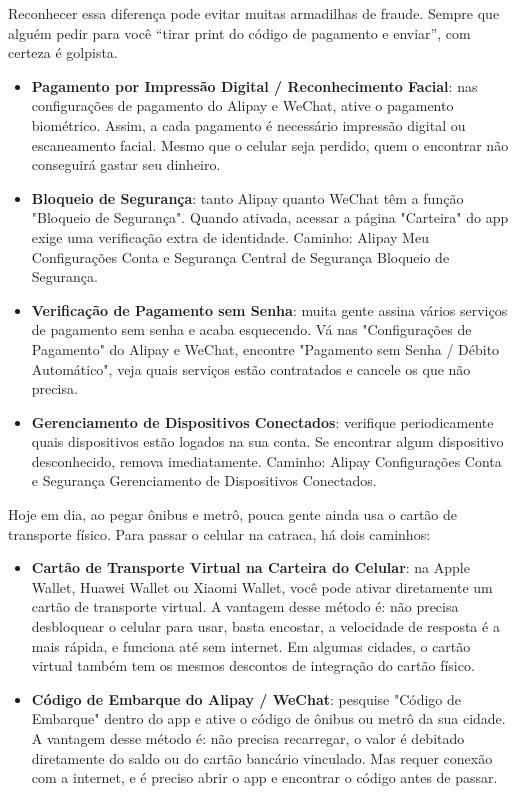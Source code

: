 Reconhecer essa diferença pode evitar muitas armadilhas de fraude. Sempre que alguém pedir para você “tirar print do código de pagamento e enviar”, com certeza é golpista.


\begin{itemize}
  \item \textbf{Pagamento por Impressão Digital / Reconhecimento Facial}: nas configurações de pagamento do Alipay e WeChat, ative o pagamento biométrico. Assim, a cada pagamento é necessário impressão digital ou escaneamento facial. Mesmo que o celular seja perdido, quem o encontrar não conseguirá gastar seu dinheiro.
  \item \textbf{Bloqueio de Segurança}: tanto Alipay quanto WeChat têm a função "Bloqueio de Segurança". Quando ativada, acessar a página "Carteira" do app exige uma verificação extra de identidade. Caminho: Alipay Meu Configurações Conta e Segurança Central de Segurança Bloqueio de Segurança.
  \item \textbf{Verificação de Pagamento sem Senha}: muita gente assina vários serviços de pagamento sem senha e acaba esquecendo. Vá nas "Configurações de Pagamento" do Alipay e WeChat, encontre "Pagamento sem Senha / Débito Automático", veja quais serviços estão contratados e cancele os que não precisa.
  \item \textbf{Gerenciamento de Dispositivos Conectados}: verifique periodicamente quais dispositivos estão logados na sua conta. Se encontrar algum dispositivo desconhecido, remova imediatamente. Caminho: Alipay Configurações Conta e Segurança Gerenciamento de Dispositivos Conectados.
\end{itemize}


Hoje em dia, ao pegar ônibus e metrô, pouca gente ainda usa o cartão de transporte físico. Para passar o celular na catraca, há dois caminhos:

\begin{itemize}
  \item \textbf{Cartão de Transporte Virtual na Carteira do Celular}: na Apple Wallet, Huawei Wallet ou Xiaomi Wallet, você pode ativar diretamente um cartão de transporte virtual. A vantagem desse método é: não precisa desbloquear o celular para usar, basta encostar, a velocidade de resposta é a mais rápida, e funciona até sem internet. Em algumas cidades, o cartão virtual também tem os mesmos descontos de integração do cartão físico.
  \item \textbf{Código de Embarque do Alipay / WeChat}: pesquise "Código de Embarque" dentro do app e ative o código de ônibus ou metrô da sua cidade. A vantagem desse método é: não precisa recarregar, o valor é debitado diretamente do saldo ou do cartão bancário vinculado. Mas requer conexão com a internet, e é preciso abrir o app e encontrar o código antes de passar.
\end{itemize}

